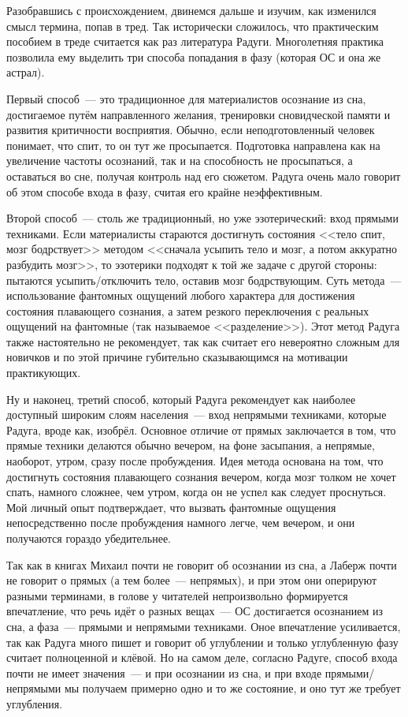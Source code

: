 \documentclass[a5paper,12pt,twoside]{memoir}
\begin{document}
Разобравшись с происхождением, двинемся дальше и изучим, как изменился смысл термина, попав в тред. Так исторически сложилось, что практическим пособием в треде считается как раз литература Радуги. Многолетняя практика позволила ему выделить три способа попадания в фазу (которая ОС и она же астрал).

Первый способ~--- это традиционное для материалистов осознание из сна, достигаемое путём направленного желания, тренировки сновидческой памяти и развития критичности восприятия. Обычно, если неподготовленный человек понимает, что спит, то он тут же просыпается. Подготовка направлена как на увеличение частоты осознаний, так и на способность не просыпаться, а оставаться во сне, получая контроль над его сюжетом. Радуга очень мало говорит об этом способе входа в фазу, считая его крайне неэффективным.

Второй способ~--- столь же традиционный, но уже эзотерический: вход прямыми техниками. Если материалисты стараются достигнуть состояния <<тело спит, мозг бодрствует>> методом <<сначала усыпить тело и мозг, а потом аккуратно разбудить мозг>>, то эзотерики подходят к той же задаче с другой стороны: пытаются усыпить/отключить тело, оставив мозг бодрствующим. Суть метода~--- использование фантомных ощущений любого характера для достижения состояния плавающего сознания, а затем резкого переключения с реальных ощущений на фантомные (так называемое <<разделение>>). Этот метод Радуга также настоятельно не рекомендует, так как считает его невероятно сложным для новичков и по этой причине губительно сказывающимся на мотивации практикующих.

Ну и наконец, третий способ, который Радуга рекомендует как наиболее доступный широким слоям населения~--- вход непрямыми техниками, которые Радуга, вроде как, изобрёл. Основное отличие от прямых заключается в том, что прямые техники делаются обычно вечером, на фоне засыпания, а непрямые, наоборот, утром, сразу после пробуждения. Идея метода основана на том, что достигнуть состояния плавающего сознания вечером, когда мозг толком не хочет спать, намного сложнее, чем утром, когда он не успел как следует проснуться. Мой личный опыт подтверждает, что вызвать фантомные ощущения непосредственно после пробуждения намного легче, чем вечером, и они получаются гораздо убедительнее.

Так как в книгах Михаил почти не говорит об осознании из сна, а Лаберж почти не говорит о прямых (а тем более~--- непрямых), и при этом они оперируют разными терминами, в голове у читателей непроизвольно формируется впечатление, что речь идёт о разных вещах~--- ОС достигается осознанием из сна, а фаза~--- прямыми и непрямыми техниками. Оное впечатление усиливается, так как Радуга много пишет и говорит об углублении и только углубленную фазу считает полноценной и клёвой. Но на самом деле, согласно Радуге, способ входа почти не имеет значения~--- и при осознании из сна, и при входе прямыми/непрямыми мы получаем примерно одно и то же состояние, и оно тут же требует углубления. 
\end{document}

